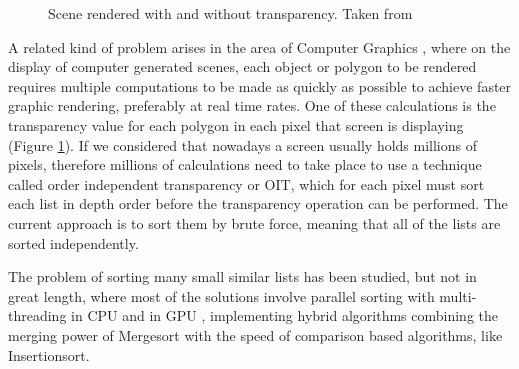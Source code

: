 \documentclass[a4paper,12pt]{article}
\begin{document}
\begin{figure}[H]
\centering
{}
\hfill %
\caption{Scene rendered with and without transparency. Taken from \cite{Arch2015}}
\label{fig:Transp}
\end{figure}

A related kind of problem arises in the area of Computer Graphics \cite{Arch2015}, where on the display of computer generated scenes, each object or polygon to be rendered requires multiple computations to be made as quickly as possible to achieve faster graphic rendering, preferably at real time rates. One of these calculations is the transparency value for each polygon in each pixel that screen is displaying (Figure \ref{fig:Transp}). If we considered that nowadays a screen usually holds millions of pixels, therefore millions of calculations need to take place to use a technique called order independent transparency or OIT, which for each pixel must sort each list in depth order before the transparency operation can be performed. The current approach is to sort them by brute force, meaning that all of the lists are sorted independently.

The problem of sorting many small similar lists  has been studied, but not in great length, where most of the solutions involve parallel sorting with multi-threading in CPU \cite{han2002integer} and in GPU \cite{hou2017fast},  implementing hybrid algorithms combining the merging power of Mergesort with the speed of comparison based algorithms, like Insertionsort. 
\\
\end{document}
